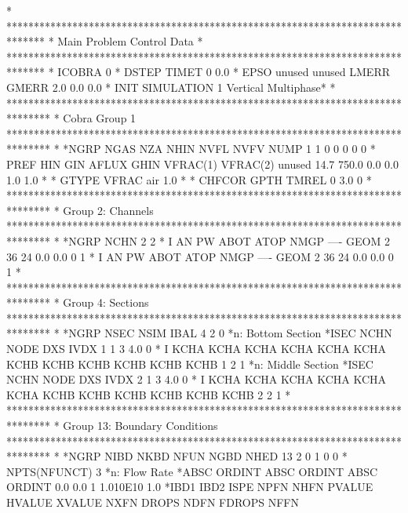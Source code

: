 *
*******************************************************************************
* Main Problem Control Data                                                   *
*******************************************************************************
*       ICOBRA
             0
*        DSTEP         TIMET
             0           0.0
*         EPSO        unused        unused         LMERR         GMERR
           2.0                                       0.0           0.0
*     INIT                                                           SIMULATION
         1                                                 Vertical Multiphase*
*
********************************************************************************
* Cobra Group 1
********************************************************************************
*
*NGRP NGAS  NZA NHIN NVFL NVFV NUMP 
    1    1    0    0    0    0    0
*     PREF       HIN       GIN     AFLUX      GHIN  VFRAC(1)  VFRAC(2)    unused
      14.7     750.0                 0.0       0.0       1.0       1.0          
*
*  GTYPE       VFRAC
air              1.0
*
*   CHFCOR      GPTH     TMREL
         0       3.0         0
*
********************************************************************************
* Group 2: Channels
********************************************************************************
*
*NGRP NCHN
    2    2
*   I   AN   PW ABOT ATOP NMGP ---- GEOM
    2   36   24  0.0  0.0    0         1
*   I   AN   PW ABOT ATOP NMGP ---- GEOM
    2   36   24  0.0  0.0    0         1
*
********************************************************************************
* Group 4: Sections
********************************************************************************
*
*NGRP NSEC NSIM IBAL 
    4    2    0
*n: Bottom Section
*ISEC NCHN NODE       DXS IVDX
    1    1    3       4.0    0
*   I KCHA KCHA KCHA KCHA KCHA KCHA KCHB KCHB KCHB KCHB KCHB KCHB
    1    2                             1
*n: Middle Section
*ISEC NCHN NODE       DXS IVDX
    2    1    3       4.0    0
*   I KCHA KCHA KCHA KCHA KCHA KCHA KCHB KCHB KCHB KCHB KCHB KCHB
    2    2                             1
*
********************************************************************************
* Group 13: Boundary Conditions
********************************************************************************
*
*NGRP NIBD NKBD NFUN NGBD NHED     
   13    2    0    1    0    0
* NPTS(NFUNCT)
    3
*n: Flow Rate
*ABSC    ORDINT ABSC    ORDINT ABSC    ORDINT
  0.0       0.0    1       1.010E10       1.0
*IBD1 IBD2 ISPE NPFN NHFN    PVALUE    HVALUE    XVALUE NXFN     DROPS NDFN    FDROPS NFFN

